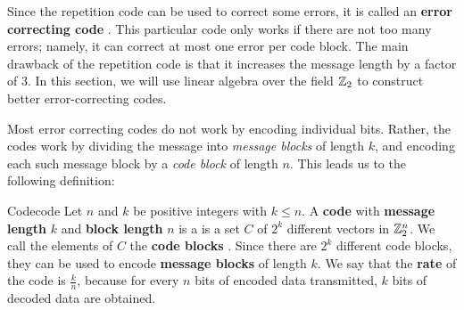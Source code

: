 Since the repetition code can be used to correct some errors, it is
called an \textbf{error correcting code}%
%
. This
particular code only works if there are not too many errors; namely,
it can correct at most one error per code block. The main drawback of
the repetition code is that it increases the message length by a
factor of 3. In this section, we will use linear algebra over the
field $\mathbb{Z}_2$ to construct better error-correcting codes.

Most error correcting codes do not work by encoding individual
bits. Rather, the codes work by dividing the message into
\textit{message blocks} of length $k$, and encoding each such message
block by a \textit{code block} of length $n$.  This leads us to the
following definition:

\begin{definition}{Code}{code}
  Let $n$ and $k$ be positive integers with $k\leq n$. A
  \textbf{code}%
   with \textbf{message length}%
   $k$ and \textbf{block
    length}%
   $n$ is a is a set $C$ of
  $2^k$ different vectors in $\mathbb{Z}_2^n$. We call the elements of $C$ the
  \textbf{code blocks}%
  . Since there are $2^k$ different code
  blocks, they can be used to encode \textbf{message blocks}%
   of length $k$. We say that the
  \textbf{rate}%
   of the code is $\frac{k}{n}$,
  because for every $n$ bits of encoded data transmitted, $k$
  bits of decoded data are obtained.
\end{definition}

